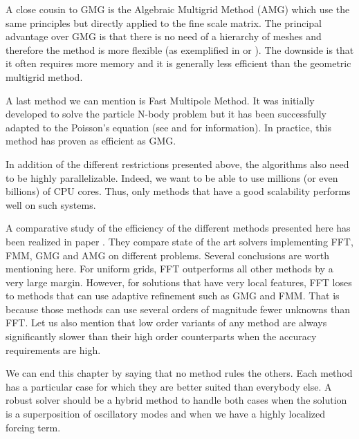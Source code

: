 A close cousin to GMG is the Algebraic Multigrid Method (AMG) which use the same principles but directly applied to the fine scale matrix. The principal advantage over GMG is that there is no need of a hierarchy of meshes and therefore the method is more flexible (as exemplified in \cite{flexiAlg} or \cite{amg}). The downside is that it often requires more memory and it is generally less efficient than the geometric multigrid method. 

A last method we can mention is Fast Multipole Method. It was initially developed to solve the particle N-body problem but it has been successfully adapted to the Poisson's equation (see \cite{fmm1} and \cite{fmm2} for information). In practice, this method has proven as efficient as GMG.

In addition of the different restrictions presented above, the algorithms also need to be highly parallelizable. Indeed, we want to be able to use millions (or even billions) of CPU cores. Thus, only methods that have a good scalability performs well on such systems.

A comparative study of the efficiency of the different methods presented here has been realized in paper \cite{compa}. They compare state of the art solvers implementing FFT, FMM, GMG and AMG on different problems. Several conclusions are worth mentioning here. For uniform grids, FFT outperforms all other methods by a very large margin. However, for solutions that have very local features, FFT loses to methods that can use adaptive refinement such as GMG and FMM. That is because those methods can use several orders of magnitude fewer unknowns than FFT. Let us also mention that low order variants of any method are always significantly slower than their high order counterparts when the accuracy requirements are high.  

We can end this chapter by saying that no method rules the others. Each method has a particular case for which they are better suited than everybody else. A robust solver should be a hybrid method to handle both cases when the solution is a superposition of oscillatory modes and when we have a highly localized forcing term.



 

